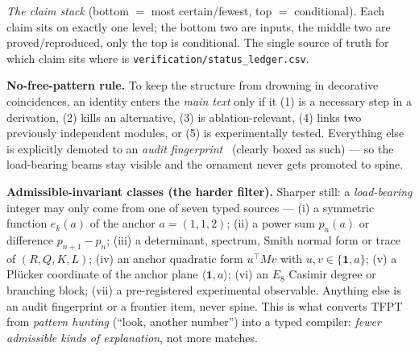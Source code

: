 \begin{center}
\end{center}
\noindent\emph{The claim stack} (bottom $=$ most certain/fewest, top $=$ conditional). Each claim sits on
exactly one level; the bottom two are inputs, the middle two are proved/reproduced, only the top is
conditional. The single source of truth for which claim sits where is
\texttt{verification/status\_ledger.csv}.

\smallskip
\noindent\textbf{No-free-pattern rule.} To keep the structure from drowning in decorative coincidences, an
identity enters the \emph{main text} only if it (1) is a necessary step in a derivation, (2) kills an
alternative, (3) is ablation-relevant, (4) links two previously independent modules, or (5) is
experimentally tested. Everything else is explicitly demoted to an \emph{audit fingerprint} \mE\ (clearly
boxed as such) --- so the load-bearing beams stay visible and the ornament never gets promoted to spine.

\noindent\textbf{Admissible-invariant classes (the harder filter).} Sharper still: a \emph{load-bearing}
integer may only come from one of seven typed sources --- (i) a symmetric function $e_k(a)$ of the anchor
$a=(1,1,2)$; (ii) a power sum $p_n(a)$ or difference $p_{n+1}{-}p_n$; (iii) a determinant, spectrum, Smith
normal form or trace of $(R,Q,K,L)$; (iv) an anchor quadratic form $u^\top M v$ with $u,v\in\{\mathbf1,a\}$;
(v) a Pl\"ucker coordinate of the anchor plane $\langle\mathbf1,a\rangle$; (vi) an $E_8$ Casimir degree or
branching block; (vii) a pre-registered experimental observable. Anything else is an audit fingerprint or a
frontier item, never spine. This is what converts TFPT from \emph{pattern hunting} (``look, another number'')
into a typed compiler: \emph{fewer admissible kinds of explanation}, not more matches.

